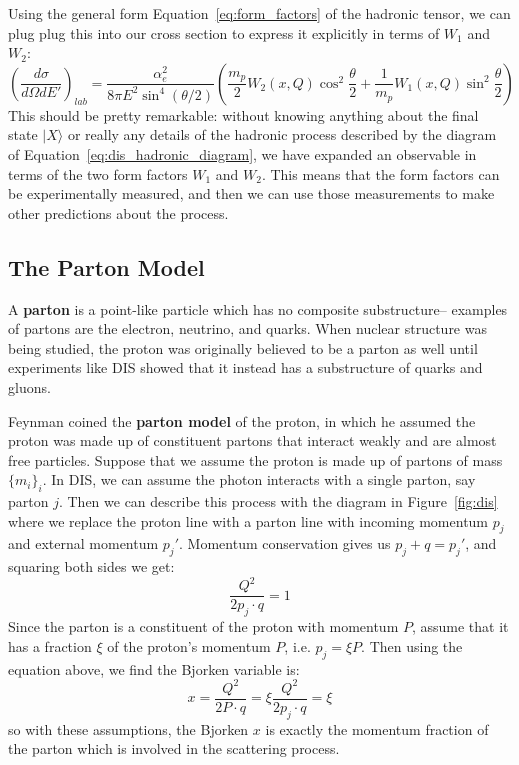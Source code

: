 \documentclass[11pt, oneside]{article}   	%
\theoremstyle{definition}
\begin{document}
Using the general form Equation~\ref{eq:form_factors} of the hadronic tensor, we can plug plug this into our cross section to express 
it explicitly in terms of $W_1$ and $W_2$:
\begin{equation}
	\left(\frac{d\sigma}{d\Omega dE'}\right)_{lab} = \frac{\alpha_e^2}{8\pi E^2\sin^4(\theta / 2)}\left(\frac{m_p}{2} W_2(x, Q)\cos^2\frac{\theta}{2} + 
	\frac{1}{m_p} W_1(x, Q)\sin^2\frac{\theta}{2}\right)~
	\label{eq:sigma_ff}
\end{equation}
This should be pretty remarkable: without knowing anything about the final state $|X\rangle$ or really any details of the hadronic process 
described by the diagram of Equation~\ref{eq:dis_hadronic_diagram}, we have expanded an observable in terms of the two form 
factors $W_1$ and $W_2$. This means that the form factors can be experimentally measured, and then we can use those measurements 
to make other predictions about the process. 

\subsection{The Parton Model}

A \textbf{parton} is a point-like particle which has no composite substructure-- examples of partons are the electron, neutrino, and quarks. 
When nuclear structure was being studied, the proton was originally believed to be a parton as well until experiments like DIS showed 
that it instead has a substructure of quarks and gluons. 

Feynman coined the \textbf{parton model} of the proton, in which he assumed the proton was made up of constituent 
partons that interact weakly and are almost free particles. Suppose that we assume the proton is made up of partons of mass 
$\{m_i\}_{i}$. In DIS, we can assume the photon interacts with a single parton, say parton $j$. Then we can describe this process 
with the diagram in Figure~\ref{fig:dis} where we replace the proton line with a parton line with incoming momentum $p_j$ and external 
momentum $p_j'$. Momentum conservation gives us $p_j + q = p_j'$, and squaring both sides we get:
\begin{equation}
	\frac{Q^2}{2p_j\cdot q} = 1
\end{equation}
Since the parton is a constituent of the proton with momentum $P$, assume that it has a fraction $\xi$ of the proton's 
momentum $P$, i.e. $p_j = \xi P$. Then using the equation above, we find the Bjorken variable is:
\begin{equation}
	x = \frac{Q^2}{2P\cdot q} = \xi \frac{Q^2}{2p_j\cdot q} = \xi
\end{equation}
so with these assumptions, the Bjorken $x$ is exactly the momentum fraction of the parton which is involved in the scattering 
process. 
\end{document}
